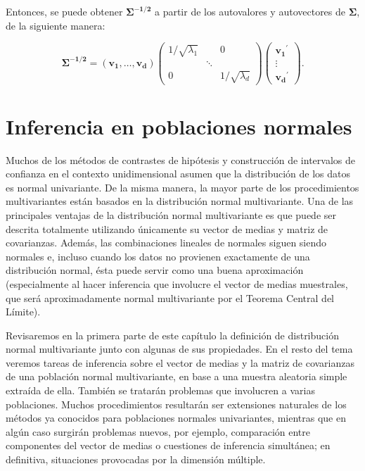 \documentclass[
  a4paper,
  oneside]{scrbook}
\theoremstyle{definition}
\theoremstyle{definition}
\theoremstyle{definition}
\theoremstyle{definition}
\theoremstyle{remark}
\begin{document}
Entonces, se puede obtener \(\bm{\Sigma^{-1/2}}\) a partir de los
autovalores y autovectores de \(\bm\Sigma\), de la siguiente manera:

\[{\bm{\Sigma^{-1/2}}}=\left(\bm{v_1},\ldots,\bm{v_d}\right)\left(\begin{array}{ccc}
1/\sqrt{\lambda_1} & & 0 \\
 & \ddots & \\
 0 & & 1/\sqrt{\lambda_d}
 \end{array}\right)\left(\begin{array}{c}
 \bm{v_1}^{\prime} \\
 \vdots \\
 \bm{v_d}^{\prime}
 \end{array}\right).\]

\chapter{Inferencia en poblaciones normales}\label{inferencia-en-poblaciones-normales}

Muchos de los métodos de contrastes de hipótesis y construcción de
intervalos de confianza en el contexto unidimensional asumen que la
distribución de los datos es normal univariante. De la misma manera, la
mayor parte de los procedimientos multivariantes están basados en la
distribución normal multivariante. Una de las principales ventajas de la
distribución normal multivariante es que puede ser descrita totalmente
utilizando únicamente su vector de medias y matriz de covarianzas.
Además, las combinaciones lineales de normales siguen siendo normales e,
incluso cuando los datos no provienen exactamente de una distribución
normal, ésta puede servir como una buena aproximación (especialmente al
hacer inferencia que involucre el vector de medias muestrales, que será
aproximadamente normal multivariante por el Teorema Central del Límite).

Revisaremos en la primera parte de este capítulo la definición de
distribución normal multivariante junto con algunas de sus propiedades.
En el resto del tema veremos tareas de inferencia sobre el vector de
medias y la matriz de covarianzas de una población normal multivariante,
en base a una muestra aleatoria simple extraída de ella. También se
tratarán problemas que involucren a varias poblaciones. Muchos
procedimientos resultarán ser extensiones naturales de los métodos ya
conocidos para poblaciones normales univariantes, mientras que en algún
caso surgirán problemas nuevos, por ejemplo, comparación entre
componentes del vector de medias o cuestiones de inferencia simultánea;
en definitiva, situaciones provocadas por la dimensión múltiple.
\end{document}
